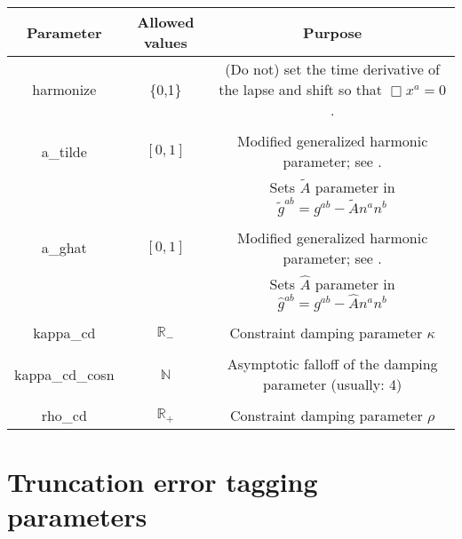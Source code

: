\documentclass{article}
\begin{document}
\begin{table}[h]
   \centering 
   \begin{tabular}{ccc}
      Parameter  & Allowed values & Purpose \\
     \midrule\midrule
      harmonize
      &
      \{0,1\}
      & (Do not) set the time derivative of the lapse
      and shift so that $\Box x^a=0$.
      \\ \\
      a\_tilde
      &
      $\left[0,1\right]$
      &
      Modified generalized harmonic parameter; see
      \cite{East:2020hgw}.
      \\
      & & 
      Sets $\tilde{A}$ parameter in 
      $\tilde{g}^{ab} = g^{ab} - \tilde{A} n^an^b$
      \\ \\
      a\_ghat 
      &
      $\left[0,1\right]$
      &
      Modified generalized harmonic parameter; see
      \cite{East:2020hgw}.
      \\
      & & 
      Sets $\hat{A}$ parameter in 
      $\hat{g}^{ab} = g^{ab} - \hat{A} n^an^b$
      \\ \\
      kappa\_cd 
      & 
      $\mathbb{R}_-$
      &
      Constraint damping parameter $\kappa$
      \\ \\
      kappa\_cd\_cosn 
      &
      $\mathbb{N}$
      &
      Asymptotic falloff of the damping parameter (usually: 4)
      \\ \\
      rho\_cd 
      &
      $\mathbb{R}_+$
      &
      Constraint damping parameter $\rho$
   \end{tabular}
\end{table}

\newpage
\section*{Truncation error tagging parameters}
\end{document}
